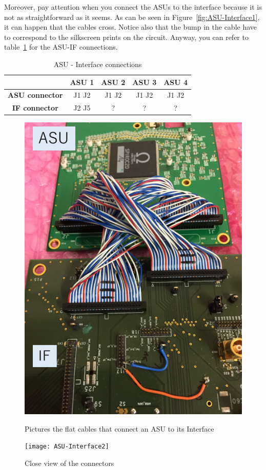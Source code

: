 Moreover, pay attention when you connect the ASUs to the interface because it is
not as straightforward as it seems. As can be seen in
Figure~\ref{fig:ASU-Interface1}, it can happen that the cables cross. Notice
also that the bump in the cable have to correspond to the silkscreen prints on
the circuit. Anyway, you can refer to table~\ref{tab:ASU-IF} for the ASU-IF
connections.
\begin{table}[H]
  \centering \bgroup
  \def\arraystretch{1.5}%
  \begin{tabular}{|c|c|c|c|c|}
    \hline
    & \textbf{ASU 1} & \textbf{ASU 2} & \textbf{ASU 3} & \textbf{ASU 4} \\
    \hline
    \textbf{ASU connector} & J1 J2 & J1 J2 & J1 J2 & J1 J2  \\
    \hline
    \textbf{IF connector} & J2 J5 & ? & ? & ?  \\ %
    \hline
  \end{tabular}
  \egroup
  \caption{ASU - Interface connections}\label{tab:ASU-IF}
\end{table}
\begin{figure}[ht]
  \centering
  \begin{minipage}{0.4\linewidth}
    \centering \includegraphics[width=0.9\linewidth,frame]{ASU-Interface1}
    \caption{Pictures the flat cables that connect an ASU to its
      Interface}\label{fig:ASU-Interface1}
  \end{minipage}%
  \begin{minipage}{0.5\linewidth}
    \centering \texttt{[image: ASU-Interface2]}
    \caption{Close view of the connectors}\label{fig:ASU-Interface2}
  \end{minipage}
\end{figure}


